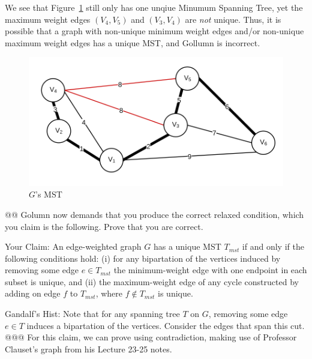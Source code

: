 \documentclass[10pt]{article}\usepackage[]{graphicx}\usepackage[]{xcolor}
\begin{document}
\begin{easylist}[enumerate]
    We see that Figure~\ref{fig:3bb} still only has one unqiue Minumum Spanning Tree, yet the maximum weight edges
    $(V_4, V_5)$ and $(V_3, V_4)$ are \textit{not} unique. Thus, it is possible that a graph with non-unique minimum
    weight edges and/or non-unique maximum weight edges has a unique MST, and Gollumn is incorrect.

    \begin{figure}[H]
        \centering
        \includegraphics[scale=0.5]{./img/ps8/3b2.png}
        \caption{$G$'s MST}
        \label{fig:3bb}
    \end{figure}

    @@ Golumn now demands that you produce the correct relaxed condition, which you claim is the following. Prove that
    you are correct.

    Your Claim: An edge-weighted graph $G$ has a unique MST $T_{mst}$ if and only if the following conditions hold:
    (i) for any bipartation of the vertices induced by removing some edge $e \in T_{mst}$ the minimum-weight edge with
    one endpoint in each subset is unique, and
    (ii) the maximum-weight edge of any cycle constructed by adding on edge $f$ to $T_{mst}$, where $f \not\in T_{mst}$
    is unique.

    Gandalf's Hist: Note that for any spanning tree $T$ on $G$, removing some edge $e \in T$ induces a bipartation of
    the vertices. Consider the edges that span this cut.
    @@@ For this claim, we can prove using contradiction, making use of Professor Clauset's graph from his Lecture 23-25
    notes.


\end{easylist}
\end{document}
